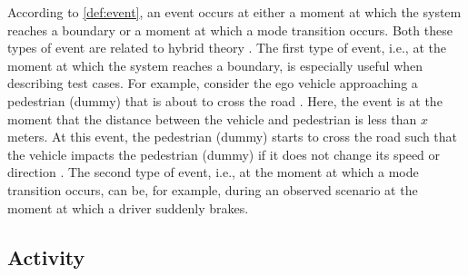 According to \cref{def:event}, an event occurs at either a moment at which the system reaches a boundary or a moment at which a mode transition occurs. 
\cbstart
Both these types of event are related to hybrid theory \cite{deschutter2003hybrid, heemels2012eventcontrol}.
The first type of event, i.e., at the moment at which the system reaches a boundary, is especially useful when describing test cases. For example, consider the ego vehicle approaching a pedestrian (dummy) that is about to cross the road \cite{seiniger2015test}. Here, the event is at the moment that the distance between the vehicle and pedestrian is less than $x$ meters. At this event, the pedestrian (dummy) starts to cross the road such that the vehicle impacts the pedestrian (dummy) if it does not change its speed or direction \cite{seiniger2015test}.
The second type of event, i.e., at the moment at which a mode transition occurs, can be, for example, during an observed scenario at the moment at which a driver suddenly brakes. 
\cbend





\subsection{Activity}
\label{sec:activity}

